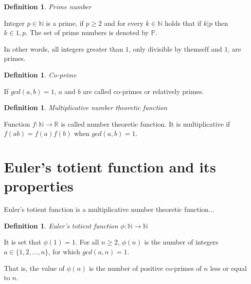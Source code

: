 \documentclass{article}
\theoremstyle{definition}
\newtheorem{definition}[subsection]{Definition}
\begin{document}
\begin{definition}{\emph{Prime number}}

Integer $p\in\mathbb{N}$ is a prime, if $p \geq 2$ and for every $k\in\mathbb{N}$ holds that if $k \vert p$ then $k\in{1, p}$. The set of prime numbers is denoted by $\mathbb{P}$.

In other words, all integers greater than $1$, only divisible by themself and $1$, are primes.


\end{definition}

\begin{definition}{\emph{Co-prime}}

If $gcd(a,b) = 1$, $a$ and $b$ are called co-primes or relatively primes.

\end{definition}

\begin{definition}{\emph{Multiplicative number theoretic function}}

Function $f: \mathbb{N} \rightarrow \mathbb{R}$ is called number theoretic function. It is multiplicative if $f(ab) = f(a)f(b)$ when $gcd(a, b)=1$.

\end{definition}

\section{Euler's totient function and its properties}

Euler's totient function is a multiplicative number theoretic function...

\begin{definition}{\emph{Euler's totient function $\phi: \mathbb{N} \rightarrow \mathbb{N}$}}


It is set that $\phi(1) = 1$. For all $n \geq 2$, $\phi(n)$ is the number of integers $a \in \{1,2,...,n\}$, for which $gcd(a,n) = 1$.

\end{definition}


That is, the value of $\phi(n)$ is the number of positive co-primes of $n$ less or equal to $n$.
\end{document}
